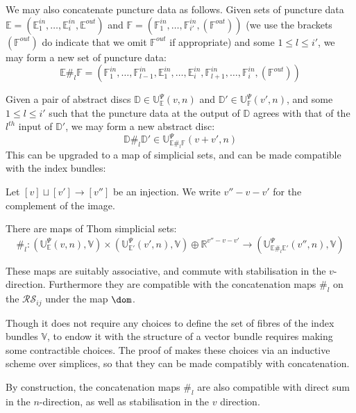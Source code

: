 \documentclass{TPmod}
\def\bD{\mathbb{D}}
\def\bE{\mathbb{E}}
\def\bF{\mathbb{F}}
\def\bR{\mathbb{R}}
\def\bU{\mathbb{U}}
\def\bV{\mathbb{V}}
\newcommand{\cR}{\mathcal{R}}
\newcommand{\cS}{\mathcal{S}}
\numberwithin{equation}{section}
\begin{document}
We may also concatenate puncture data as follows. Given sets of puncture data $\bE = (\bE^{in}_1, \ldots, \bE^{in}_i, \bE^{out})$ and $\bF = (\bF^{in}_1, \ldots, \bF_{i'}^{in}, (\bF^{out}))$ (we use the brackets $(\bF^{out})$ do indicate that we omit $\bF^{out}$ if appropriate) and some $1 \leq l \leq i'$, we may form a new set of puncture data:
\begin{equation}
    \bE \#_l \bF = \left(\bF^{in}_1, \ldots, \bF^{in}_{l-1}, \bE^{in}_1, \ldots, \bE^{in}_i, \bF^{in}_{l+1}, \ldots, \bF^{in}_i, (\bF^{out})\right)
\end{equation}

Given a pair of abstract discs $\bD \in \bU^\Psi_{\bE}(v, n)$ and $\bD' \in \bU^\Psi_{\bF}(v', n)$, and some $1 \leq l \leq i'$ such that the puncture data at the output of $\bD$ agrees with that of the $l^{th}$ input of $\bD'$, we may form a new abstract disc:
\begin{equation} 
    \bD \#_l \bD' \in \bU^\Psi_{\bE\#_l \bF}(v+v', n)
\end{equation}
This can be upgraded to a map of simplicial sets, and can be made compatible with the index bundles:
\begin{lem}[{\cite[Lemma 3.18]{PS2}}]
    Let $[v] \sqcup [v'] \to [v'']$ be an injection. We write $v''-v-v'$ for the complement of the image.

    There are maps of Thom simplicial sets:
    \begin{equation}
        \#_l: \left(\bU^\Psi_{\bE}(v, n), \bV\right) \times \left(\bU^\Psi_{\bE'}(v', n), \bV\right) \oplus \bR^{v''-v-v'} \to \left(\bU^\Psi_{\bE \#_l \bE'}(v'', n), \bV\right)
    \end{equation}

    These maps are suitably associative, and commute with stabilisation in the $v$-direction. Furthermore they are compatible with the concatenation maps $\#_l$ on the $\cR\cS_{ij}$ under the map $\dom$.
\end{lem}

\begin{rmk}
    Though it does not require any choices to define the set of fibres of the index bundles $\bV$, to endow it with the structure of a vector bundle requires making some contractible choices. The proof of \cite[Lemma 3.18]{PS2} makes these choices via an inductive scheme over simplices, so that they can be made compatibly with concatenation.
\end{rmk}

By construction, the concatenation maps $\#_l$ are also compatible with direct sum in the $n$-direction, as well as stabilisation in the $v$ direction.
\end{document}

